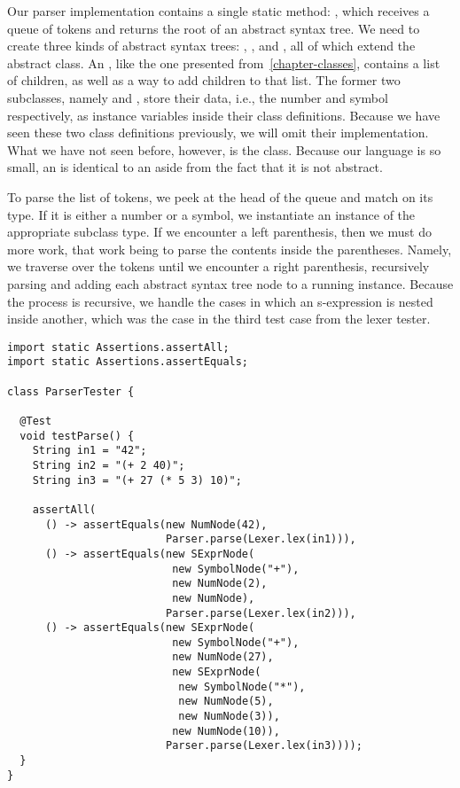 Our parser implementation contains a single static method: , which receives a queue of tokens and returns the root of an abstract syntax tree. 
We need to create three kinds of abstract syntax trees: , , and , all of which extend the abstract  class. 
An , like the one presented from~\cref{chapter-classes}, contains a list of children, as well as a way to add children to that list. 
The former two subclasses, namely  and , store their data, i.e., the number and symbol respectively, as instance variables inside their class definitions. 
Because we have seen these two class definitions previously, we will omit their implementation. 
What we have not seen before, however, is the  class. 
Because our language is so small, an  is identical to an  aside from the fact that it is not abstract.

To parse the list of tokens, we peek at the head of the queue and match on its type. 
If it is either a number or a symbol, we instantiate an instance of the appropriate subclass type. 
If we encounter a left parenthesis, then we must do more work, that work being to parse the contents inside the parentheses. 
Namely, we traverse over the tokens until we encounter a right parenthesis, recursively parsing and adding each abstract syntax tree node to a running  instance. 
Because the process is recursive, we handle the cases in which an s-expression is nested inside another, which was the case in the third test case from the lexer tester.

\begin{lstlisting}[language=MyJava]
import static Assertions.assertAll;
import static Assertions.assertEquals;

class ParserTester {

  @Test
  void testParse() {
    String in1 = "42";
    String in2 = "(+ 2 40)";
    String in3 = "(+ 27 (* 5 3) 10)";

    assertAll(
      () -> assertEquals(new NumNode(42), 
                         Parser.parse(Lexer.lex(in1))),
      () -> assertEquals(new SExprNode(
                          new SymbolNode("+"),
                          new NumNode(2),
                          new NumNode), 
                         Parser.parse(Lexer.lex(in2))),
      () -> assertEquals(new SExprNode(
                          new SymbolNode("+"),
                          new NumNode(27),
                          new SExprNode(
                           new SymbolNode("*"),
                           new NumNode(5),
                           new NumNode(3)),
                          new NumNode(10)), 
                         Parser.parse(Lexer.lex(in3))));
  }
}
\end{lstlisting}

